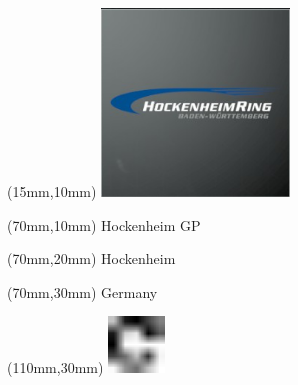 \null\newpage
\begin{textblock*}{50mm}(15mm,10mm)%
\includegraphics[width=50mm]{LG/2015-05-20_00082.png}
\end{textblock*}
\begin{textblock*}{130mm}(70mm,10mm)%
{\fontsize{20}{20}\selectfont Hockenheim GP}\\
\end{textblock*}
\begin{textblock*}{120mm}(70mm,20mm)%
{\fontsize{16}{16}\selectfont Hockenheim}\\
\end{textblock*}
\begin{textblock*}{120mm}(70mm,30mm)%
{\fontsize{12}{12}\selectfont Germany}
\end{textblock*}
\begin{textblock*}{30mm}(110mm,30mm)%
\centering
\includegraphics[height=15mm]{icons/fa-rotate-right.pdf}
\end{textblock*}
